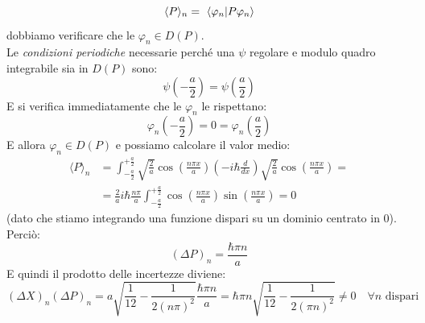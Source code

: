 \documentclass[../../FisicaTeorica.tex]{subfiles}
\begin{document}
\begin{enumerate}
\[
\langle P \rangle_n =\ \braket{\varphi_n |P\varphi_n}
\]
dobbiamo verificare che le $\varphi_n \in D(P)$.\\
Le \textit{condizioni periodiche} necessarie perché una $\psi$ regolare e modulo quadro integrabile sia in $D(P)$ sono:
\[
\psi\left(-\frac{a}{2}\right)=\psi\left(\frac{a}{2}\right)
\]
E si verifica immediatamente che le $\varphi_n$ le rispettano:
\[
\varphi_n\left(-\frac{a}{2}\right)=0=\varphi_n\left(\frac{a}{2}\right)
\]
E allora $\varphi_n \in D(P)$ e possiamo calcolare il valor medio:
\begin{align*}
\langle P \rangle_n &= \int_{-\frac{a}{2}}^{+\frac{a}{2}}\sqrt{\frac{2}{a}}\cos\left(\frac{n\pi x}{a}\right) \left(-i\hbar\frac{d}{dx}\right) \sqrt{\frac{2}{a}}\cos\left(\frac{n\pi x}{a}\right)= 
\\
&=\frac{2}{a}i\hbar \frac{n\pi}{a} \int_{-\frac{a}{2}}^{+\frac{a}{2}} \cos\left(\frac{n\pi x}{a}\right) \sin\left(\frac{n\pi x}{a}\right) = 0
\end{align*}
(dato che stiamo integrando una funzione dispari su un dominio centrato in $0$). Perciò: 
\[
(\Delta P)_n = \frac{\hbar \pi n}{a}
\]
E quindi il prodotto delle incertezze diviene:
\[
(\Delta X)_n(\Delta P)_n =a \sqrt{\frac{1}{12}-\frac{1}{2(n\pi)^2}}\frac{\hbar \pi n}{a}=\hbar \pi n \sqrt{\frac{1}{12}-\frac{1}{2(\pi n)^2}} \neq 0 \quad \forall n \text{ dispari}
\]


\end{enumerate}
\end{document}
